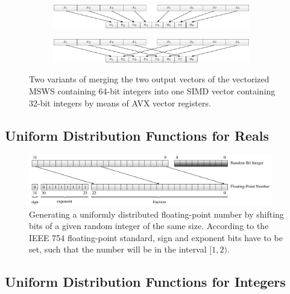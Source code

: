 \documentclass{stdlocal}
\begin{document}
    \begin{figure}
      \center
      \begin{subfigure}[b]{\textwidth}
        \center
        \includegraphics[width=0.95\textwidth]{figures/msws_merge.pdf}
      \end{subfigure}

      \begin{subfigure}[b]{\textwidth}
        \center
        \includegraphics[width=0.95\textwidth]{figures/msws_merge2.pdf}
      \end{subfigure}
      \caption[MSWS Vector Merge Scheme]{%
        Two variants of merging the two output vectors of the vectorized MSWS containing 64-bit integers into one SIMD vector containing 32-bit integers by means of AVX vector registers.
      }
      \label{fig:msws-vector-merge-scheme}
    \end{figure}


  \subsection{Uniform Distribution Functions for Reals} %
  \label{sub:uniform_real_distribution}

    \begin{figure}
      \center
      \includegraphics[width=0.95\textwidth]{figures/uniform_implementation_scheme.pdf}
      \caption[Real Uniform Distribution Function Implementation Scheme]{%
        Generating a uniformly distributed floating-point number by shifting bits of a given random integer of the same size.
        According to the IEEE 754 floating-point standard, sign and exponent bits have to be set, such that the number will be in the interval $[1,2)$.
      }
      \label{fig:real-uniform-implementation-scheme}
    \end{figure}

  \subsection{Uniform Distribution Functions for Integers} %
  \label{sub:uniform_distribution_functions_for_integers}

\end{document}
